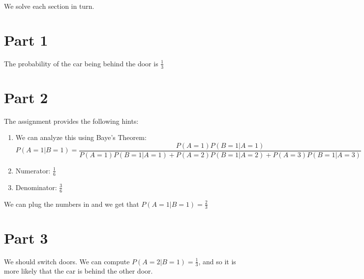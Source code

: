 We solve each section in turn.

\section{Part 1}

The probability of the car being behind the door is $\frac{1}{3}$

\section{Part 2}

The assignment provides the following hints:

\begin{enumerate}
  \item We can analyze this using Baye's Theorem:
        \begin{equation*}
          P(A=1|B=1) = \frac{P(A=1)P(B=1|A=1)}{P(A=1)P(B=1|A=1)+P(A=2)P(B=1|A=2)+P(A=3)P(B=1|A=3)}
        \end{equation*}
  \item Numerator: $\frac{1}{6}$
  \item Denominator: $\frac{3}{6}$
\end{enumerate}

We can plug the numbers in and we get that $P(A=1|B=1)=\frac{2}{3}$

\section{Part 3}

We should switch doors. We can compute $P(A=2|B=1) = \frac{1}{3}$, and so it is more likely that the car is behind the other door.
